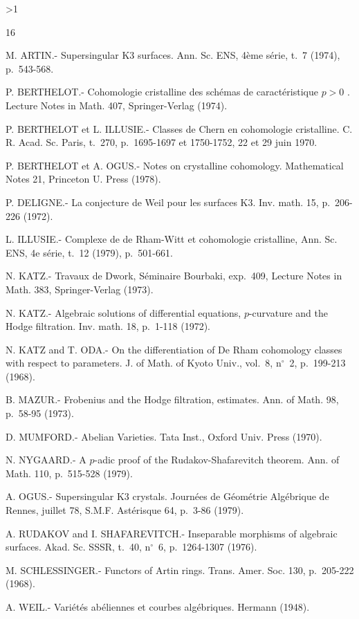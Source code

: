 \documentclass[10pt]{article}
\newcommand{\DPage}[2]{\ifnum#1>1\clearpage\fi\setcounter{page}{#2}}
\begin{document}
\vspace{1cm}
\DPage{22}{79}
\renewcommand{\refname}{\centering BIBLIOGRAPHIE}
\begin{thebibliography}{16}\setlength{\itemsep}{0.35em}
\par{} M. ARTIN.- Supersingular K3 surfaces. Ann. Sc. ENS, 4ème série, t.~7 (1974), p.~543-568.
\par{} P. BERTHELOT.- Cohomologie cristalline des schémas de caractéristique $p>0$ . Lecture Notes in Math. 407, Springer-Verlag (1974).
\par{} P. BERTHELOT et L. ILLUSIE.- Classes de Chern en cohomologie cristalline. C. R. Acad. Sc. Paris, t.~270, p.~1695-1697 et 1750-1752, 22 et 29 juin 1970.
\par{} P. BERTHELOT et A. OGUS.- Notes on crystalline cohomology. Mathematical Notes 21, Princeton U. Press (1978).
\par{} P. DELIGNE.- La conjecture de Weil pour les surfaces K3. Inv. math. 15, p.~206-226 (1972).
\par{} L. ILLUSIE.- Complexe de de Rham-Witt et cohomologie cristalline, Ann. Sc. ENS, 4e série, t.~12 (1979), p.~501-661.
\par{} N. KATZ.- Travaux de Dwork, Séminaire Bourbaki, exp.~409, Lecture Notes in Math. 383, Springer-Verlag (1973).
\par{} N. KATZ.- Algebraic solutions of differential equations, $p$-curvature and the Hodge filtration. Inv. math. 18, p.~1-118 (1972).
\par{} N. KATZ and T. ODA.- On the differentiation of De Rham cohomology classes with respect to parameters. J. of Math. of Kyoto Univ., vol.~8, n$^\circ$~2, p.~199-213 (1968).
\par{} B. MAZUR.- Frobenius and the Hodge filtration, estimates. Ann. of Math. 98, p.~58-95 (1973).
\par{} D. MUMFORD.- Abelian Varieties. Tata Inst., Oxford Univ. Press (1970).
\par{} N. NYGAARD.- A $p$-adic proof of the Rudakov-Shafarevitch theorem. Ann. of Math. 110, p.~515-528 (1979).
\par{} A. OGUS.- Supersingular K3 crystals. Journées de Géométrie Algébrique de Rennes, juillet 78, S.M.F. Astérisque 64, p.~3-86 (1979).
\par{} A. RUDAKOV and I. SHAFAREVITCH.- Inseparable morphisms of algebraic surfaces. Akad. Sc. SSSR, t.~40, n$^\circ$~6, p.~1264-1307 (1976).
\par{} M. SCHLESSINGER.- Functors of Artin rings. Trans. Amer. Soc. 130, p.~205-222 (1968).
\par{} A. WEIL.- Variétés abéliennes et courbes algébriques. Hermann (1948).
\end{thebibliography}
\end{document}
